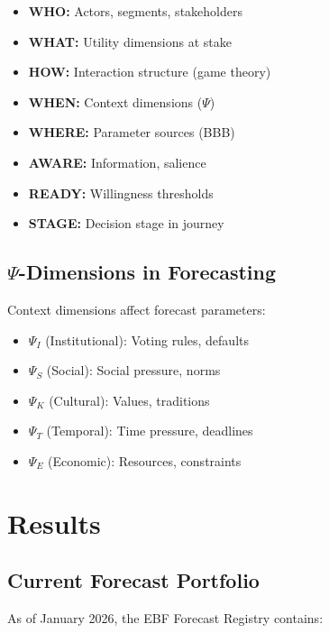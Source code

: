 \begin{itemize}
    \item \textbf{WHO:} Actors, segments, stakeholders
    \item \textbf{WHAT:} Utility dimensions at stake
    \item \textbf{HOW:} Interaction structure (game theory)
    \item \textbf{WHEN:} Context dimensions ($\Psi$)
    \item \textbf{WHERE:} Parameter sources (BBB)
    \item \textbf{AWARE:} Information, salience
    \item \textbf{READY:} Willingness thresholds
    \item \textbf{STAGE:} Decision stage in journey
\end{itemize}

\subsection{$\Psi$-Dimensions in Forecasting}

Context dimensions affect forecast parameters:

\begin{itemize}
    \item $\Psi_I$ (Institutional): Voting rules, defaults
    \item $\Psi_S$ (Social): Social pressure, norms
    \item $\Psi_K$ (Cultural): Values, traditions
    \item $\Psi_T$ (Temporal): Time pressure, deadlines
    \item $\Psi_E$ (Economic): Resources, constraints
\end{itemize}

\section{Results}
\label{sec:fct-results}

\subsection{Current Forecast Portfolio}

As of January 2026, the EBF Forecast Registry contains:

